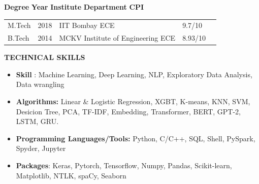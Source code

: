 \documentclass{article}
\begin{document}
 \begin{theorem}
\textbf{Degree}  \hspace{1.2cm} \textbf{Year}  \hspace{1.1 cm} \textbf{Institute} \hspace{3.4 cm} \textbf{Department}   \hspace{1cm}  \textbf{CPI} 
 \end{theorem}
 \vspace{-3mm}
\renewcommand{\tabcolsep}{5mm}
\begin{table}[htb]
\begin{tabular}{lllll}
M.Tech & \hspace{0.4cm} 2018 & \hspace{0.2cm} IIT Bombay \hspace{3.15cm} ECE    & \hspace{1.4cm} 9.7/10   \\
B.Tech      & \hspace{0.4cm} 2014       & \hspace{0.2cm} MCKV Institute of Engineering \hspace{.40cm} ECE & \hspace{1.5cm}8.93/10  
\vspace{-3mm}
\end{tabular}
\end{table}



 \begin{theorem}
   \vspace{-0.7mm}
\begin{center}
\textbf{ TECHNICAL SKILLS
}\end{center}  
\vspace{-0.9mm}    
   \end{theorem}
\vspace{-3 mm}
\begin{itemize}
\item \textbf {Skill} : Machine Learning, Deep Learning, NLP, Exploratory Data Analysis, Data wrangling   
\item \textbf{Algorithms:} Linear \& Logistic Regression, XGBT, K-means, KNN, SVM, Desicion Tree, PCA, TF-IDF, Embedding, Transformer, BERT, GPT-2, LSTM, GRU.

 \item \textbf{Programming Languages/Tools:}
 Python, C/C++, SQL, Shell,  PySpark, Spyder, Jupyter
\item \textbf{Packages}: Keras, Pytorch, Tensorflow, Numpy, Pandas, Scikit-learn, Matplotlib, NTLK, spaCy, Seaborn

\end{itemize}
\end{document}

